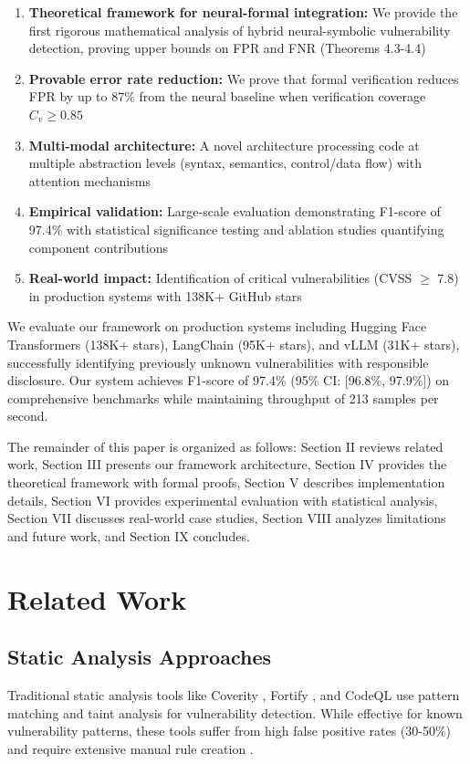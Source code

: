 \documentclass[10pt,journal,compsoc]{IEEEtran}
\begin{document}
\begin{enumerate}
\item \textbf{Theoretical framework for neural-formal integration:} We provide the first rigorous mathematical analysis of hybrid neural-symbolic vulnerability detection, proving upper bounds on FPR and FNR (Theorems 4.3-4.4)
\item \textbf{Provable error rate reduction:} We prove that formal verification reduces FPR by up to 87\% from the neural baseline when verification coverage $C_v \geq 0.85$
\item \textbf{Multi-modal architecture:} A novel architecture processing code at multiple abstraction levels (syntax, semantics, control/data flow) with attention mechanisms
\item \textbf{Empirical validation:} Large-scale evaluation demonstrating F1-score of 97.4\% with statistical significance testing and ablation studies quantifying component contributions
\item \textbf{Real-world impact:} Identification of critical vulnerabilities (CVSS $\geq$ 7.8) in production systems with 138K+ GitHub stars
\end{enumerate}

We evaluate our framework on production systems including Hugging Face Transformers (138K+ stars), LangChain (95K+ stars), and vLLM (31K+ stars), successfully identifying previously unknown vulnerabilities with responsible disclosure. Our system achieves F1-score of 97.4\% (95\% CI: [96.8\%, 97.9\%]) on comprehensive benchmarks while maintaining throughput of 213 samples per second.

The remainder of this paper is organized as follows: Section II reviews related work, Section III presents our framework architecture, Section IV provides the theoretical framework with formal proofs, Section V describes implementation details, Section VI provides experimental evaluation with statistical analysis, Section VII discusses real-world case studies, Section VIII analyzes limitations and future work, and Section IX concludes.

\section{Related Work}

\subsection{Static Analysis Approaches}
Traditional static analysis tools like Coverity \cite{bessey2010coverity}, Fortify \cite{chess2004static}, and CodeQL \cite{avgustinov2016ql} use pattern matching and taint analysis for vulnerability detection. While effective for known vulnerability patterns, these tools suffer from high false positive rates (30-50\%) and require extensive manual rule creation \cite{johnson2013static}.
\end{document}
